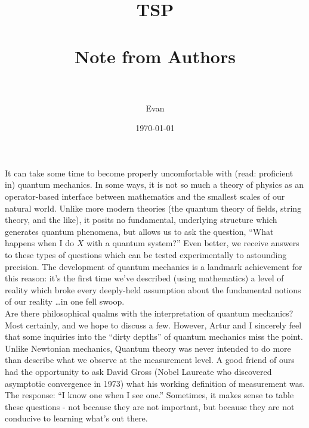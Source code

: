 \documentclass[paper=letterpaper, fontsize=11pt]{article} %
\title{	
\normalfont \normalsize 
\textsc{TSP} \\ [25pt] %
\horrule{0.5pt} \\[0.4cm] %
\huge Note from Authors \\ %
\horrule{2pt} \\[0.5cm] %
}
\author{Evan} %
\date{\normalsize\today} %
\numberwithin{equation}{section} %
\numberwithin{figure}{section} %
\numberwithin{table}{section} %
\begin{document}
\maketitle %





It can take some time to become properly uncomfortable with (read: proficient in) quantum mechanics. In some ways, it is not so much a theory of physics as an operator-based interface between mathematics and the smallest scales of our natural world. Unlike more modern theories (the quantum theory of fields, string theory, and the like), it posits no fundamental, underlying structure which generates quantum phenomena, but allows us to ask the question, ``What happens when I do $X$ with a quantum system?'' Even better, we receive answers to these types of questions which can be tested experimentally to astounding precision. The development of quantum mechanics is a landmark achievement for this reason: it's the first time we've described (using mathematics) a level of reality which broke every deeply-held assumption about the fundamental notions of our reality \ldots in one fell swoop.\\

Are there philosophical qualms with the interpretation of quantum mechanics? Most certainly, and we hope to discuss a few. However, Artur and I sincerely feel that some inquiries into the ``dirty depths'' of quantum mechanics miss the point. Unlike Newtonian mechanics, Quantum theory was never intended to do more than describe what we observe at the measurement level. A good friend of ours had the opportunity to ask David Gross (Nobel Laureate who discovered asymptotic convergence in 1973) what his working definition of measurement was. The response: ``I know one when I see one.'' Sometimes, it makes sense to table these questions - not because they are not important, but because they are not conducive to learning what's out there. \\
\end{document}
